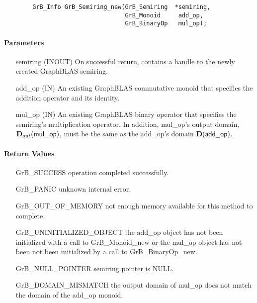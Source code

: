 \begin{verbatim}
        GrB_Info GrB_Semiring_new(GrB_Semiring  *semiring,
                                  GrB_Monoid     add_op,
                                  GrB_BinaryOp   mul_op);
\end{verbatim}

\paragraph{Parameters}

\begin{itemize}[leftmargin=1.1in]
    \item[{\sf semiring}] ({\sf INOUT}) On successful return, contains a 
    handle to the newly created GraphBLAS semiring.
    \item[{\sf add\_op}]  ({\sf IN}) An existing GraphBLAS commutative monoid that 
    specifies the addition operator and its identity.
    \item[{\sf mul\_op}]  ({\sf IN}) An existing GraphBLAS binary operator that 
    specifies the semiring's multiplication operator. In addition, {\sf mul\_op}'s
    output domain, $\mbox{$\mathbf{D}_{out}$}({\sf mul\_op})$, must be the same as the {\sf add\_op}'s
    domain $\mathbf{D}(\mbox{\sf add\_op})$.
\end{itemize}


\paragraph{Return Values}

\begin{itemize}[leftmargin=2.1in]
\item[{\sf GrB\_SUCCESS}]           operation completed successfully.
\item[{\sf GrB\_PANIC}]             unknown internal error.
\item[{\sf GrB\_OUT\_OF\_MEMORY}]   not enough memory available for this method to complete.
\item[{\sf GrB\_UNINITIALIZED\_OBJECT}]   the {\sf add\_op} object has not been
                                    initialized with a call to {\sf GrB\_Monoid\_new}
                                    or the {\sf mul\_op} object has not been
                                    not been initialized by a call to 
                                    {\sf GrB\_BinaryOp\_new}.
\item[{\sf GrB\_NULL\_POINTER}]    {\sf semiring} pointer is {\sf NULL}.
\item[{\sf GrB\_DOMAIN\_MISMATCH}]  the output domain of {\sf mul\_op} does not
                                    match the domain of the {\sf add\_op} monoid.
\end{itemize}

